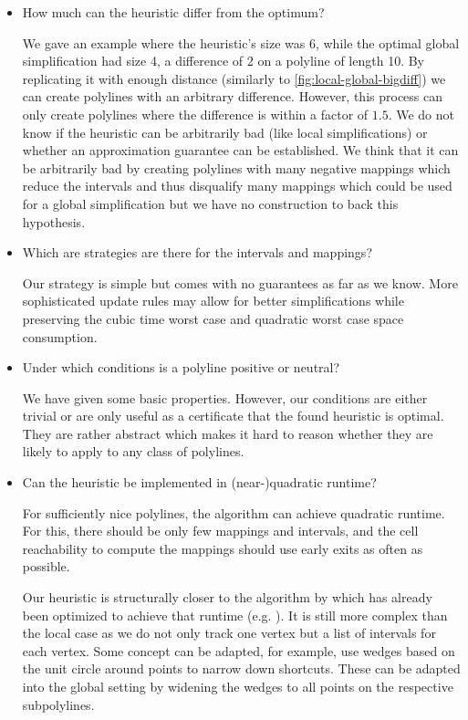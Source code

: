 \begin{itemize}
	\item	How much can the heuristic differ from the optimum?

	We gave an example where the heuristic's size was 6, while the optimal global simplification had size 4, a difference of 2 on a polyline of length 10. By replicating it with enough distance (similarly to \cref{fig:local-global-bigdiff}) we can create polylines with an arbitrary difference. However, this process can only create polylines where the difference is within a factor of \(1.5\). We do not know if the heuristic can be arbitrarily bad (like local simplifications) or whether an approximation guarantee can be established. We think that it can be arbitrarily bad by creating polylines with many negative mappings which reduce the intervals and thus disqualify many mappings which could be used for a global simplification but we have no construction to back this hypothesis.

	\item Which are strategies are there for the intervals and mappings?

	Our strategy is simple but comes with no guarantees as far as we know. More sophisticated update rules may allow for better simplifications while preserving the cubic time worst case and quadratic worst case space consumption.

	\item Under which conditions is a polyline positive or neutral?

	We have given some basic properties. However, our conditions are either trivial or are only useful as a certificate that the found heuristic is optimal. They are rather abstract which makes it hard to reason whether they are likely to apply to any class of polylines.

	\item Can the heuristic be implemented in (near-)quadratic runtime?

	For sufficiently nice polylines, the algorithm can achieve quadratic runtime. For this, there should be only few mappings and intervals, and the cell reachability to compute the mappings should use early exits as often as possible. 

	Our heuristic is structurally closer to the algorithm by \citeauthor{computational_geometric_methods_for_polygonal_approximations_of_a_curve} which has already been optimized to achieve that runtime (e.g. \cite{polyline_simplification_under_the_local_frechet_distance_has_almost_quadratic_runtime_in_2d_storandtetal}). It is still more complex than the local case as we do not only track one vertex but a list of intervals for each vertex. Some concept can be adapted, for example, \citeauthor{polyline_simplification_under_the_local_frechet_distance_has_almost_quadratic_runtime_in_2d_storandtetal} use wedges based on the unit circle around points to narrow down shortcuts. These can be adapted into the global setting by widening the wedges to all points on the respective subpolylines. 
\end{itemize}









